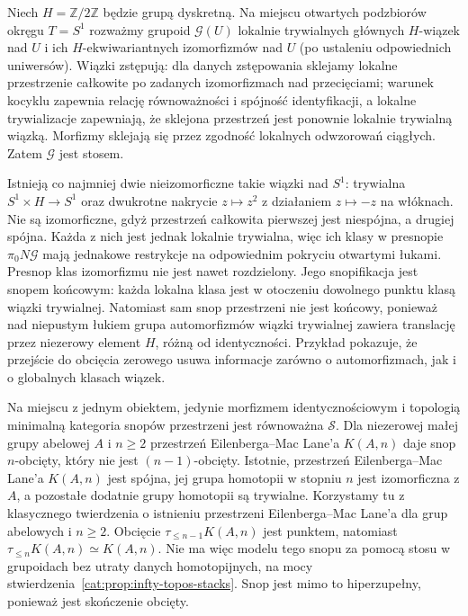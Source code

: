 \begin{przyklad}\label{cat:ex:infty-topos-torsor-stack}
Niech $H=\mathbb Z/2\mathbb Z$ będzie grupą dyskretną. Na miejscu otwartych podzbiorów okręgu $T=S^1$ rozważmy grupoid $\mathcal G(U)$ lokalnie trywialnych głównych $H$-wiązek nad $U$ i ich $H$-ekwiwariantnych izomorfizmów nad $U$ (po ustaleniu odpowiednich uniwersów). Wiązki zstępują: dla danych zstępowania sklejamy lokalne przestrzenie całkowite po zadanych izomorfizmach nad przecięciami; warunek kocyklu zapewnia relację równoważności i spójność identyfikacji, a lokalne trywializacje zapewniają, że sklejona przestrzeń jest ponownie lokalnie trywialną wiązką. Morfizmy sklejają się przez zgodność lokalnych odwzorowań ciągłych. Zatem $\mathcal G$ jest stosem.

Istnieją co najmniej dwie nieizomorficzne takie wiązki nad $S^1$: trywialna $S^1\times H\to S^1$ oraz dwukrotne nakrycie $z\mapsto z^2$ z działaniem $z\mapsto-z$ na włóknach. Nie są izomorficzne, gdyż przestrzeń całkowita pierwszej jest niespójna, a drugiej spójna. Każda z nich jest jednak lokalnie trywialna, więc ich klasy w presnopie $\pi_0N\mathcal G$ mają jednakowe restrykcje na odpowiednim pokryciu otwartymi łukami. Presnop klas izomorfizmu nie jest nawet rozdzielony. Jego snopifikacja jest snopem końcowym: każda lokalna klasa jest w otoczeniu dowolnego punktu klasą wiązki trywialnej. Natomiast sam snop przestrzeni nie jest końcowy, ponieważ nad niepustym łukiem grupa automorfizmów wiązki trywialnej zawiera translację przez niezerowy element $H$, różną od identyczności. Przykład pokazuje, że przejście do obcięcia zerowego usuwa informacje zarówno o automorfizmach, jak i o globalnych klasach wiązek.
\end{przyklad}

\begin{przyklad}\label{cat:ex:infty-topos-eilenberg-maclane}
Na miejscu z jednym obiektem, jedynie morfizmem identycznościowym i topologią minimalną kategoria snopów przestrzeni jest równoważna $\mathcal S$. Dla niezerowej małej grupy abelowej $A$ i $n\geq2$ przestrzeń Eilenberga--Mac Lane'a $K(A,n)$ daje snop $n$-obcięty, który nie jest $(n-1)$-obcięty. Istotnie, przestrzeń Eilenberga--Mac Lane'a $K(A,n)$ jest spójna, jej grupa homotopii w stopniu $n$ jest izomorficzna z $A$, a pozostałe dodatnie grupy homotopii są trywialne. Korzystamy tu z klasycznego twierdzenia o istnieniu przestrzeni Eilenberga--Mac Lane'a dla grup abelowych i $n\geq2$. Obcięcie $\tau_{\leq n-1}K(A,n)$ jest punktem, natomiast $\tau_{\leq n}K(A,n)\simeq K(A,n)$. Nie ma więc modelu tego snopu za pomocą stosu w grupoidach bez utraty danych homotopijnych, na mocy stwierdzenia~\ref{cat:prop:infty-topos-stacks}. Snop jest mimo to hiperzupełny, ponieważ jest skończenie obcięty.
\end{przyklad}

